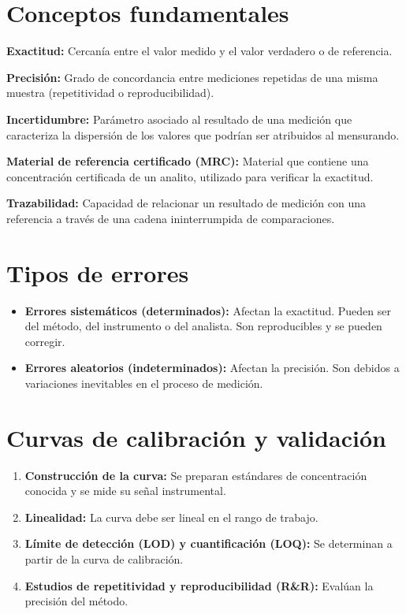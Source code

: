 \section{Conceptos fundamentales}

\textbf{Exactitud:} Cercanía entre el valor medido y el valor verdadero o de referencia.

\textbf{Precisión:} Grado de concordancia entre mediciones repetidas de una misma muestra (repetitividad o reproducibilidad).

\textbf{Incertidumbre:} Parámetro asociado al resultado de una medición que caracteriza la dispersión de los valores que podrían ser atribuidos al mensurando.

\textbf{Material de referencia certificado (MRC):} Material que contiene una concentración certificada de un analito, utilizado para verificar la exactitud.

\textbf{Trazabilidad:} Capacidad de relacionar un resultado de medición con una referencia a través de una cadena ininterrumpida de comparaciones.


\section{Tipos de errores}
\begin{itemize}
    \item \textbf{Errores sistemáticos (determinados):} Afectan la exactitud. Pueden ser del método, del instrumento o del analista. Son reproducibles y se pueden corregir.
    \item \textbf{Errores aleatorios (indeterminados):} Afectan la precisión. Son debidos a variaciones inevitables en el proceso de medición.
\end{itemize}

\section{Curvas de calibración y validación}
\begin{enumerate}
    \item \textbf{Construcción de la curva:} Se preparan estándares de concentración conocida y se mide su señal instrumental.
    \item \textbf{Linealidad:} La curva debe ser lineal en el rango de trabajo.
    \item \textbf{Límite de detección (LOD) y cuantificación (LOQ):} Se determinan a partir de la curva de calibración.
    \item \textbf{Estudios de repetitividad y reproducibilidad (R\&R):} Evalúan la precisión del método.
\end{enumerate}

